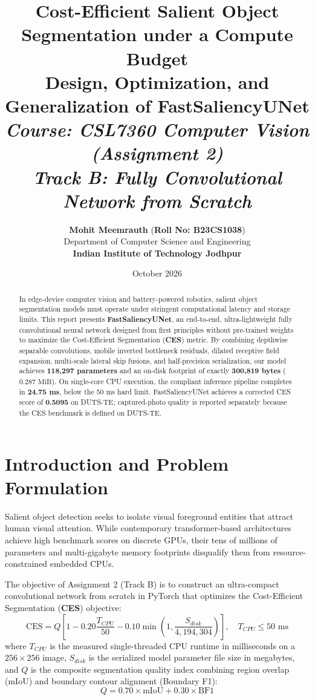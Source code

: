 \documentclass[10pt,a4paper]{article}
\title{
    \vspace{-1.2cm}
    \LARGE \textbf{\textcolor{primaryblue}{Cost-Efficient Salient Object Segmentation under a Compute Budget}} \\
    \vspace{0.2cm}
    \large \textbf{Design, Optimization, and Generalization of FastSaliencyUNet} \\
    \vspace{0.15cm}
    \normalsize \textit{Course: CSL7360 Computer Vision (Assignment 2)} \\
    \vspace{0.08cm}
    \normalsize \textit{Track B: Fully Convolutional Network from Scratch}
}
\author{
    \textbf{Mohit Meemrauth} \quad (\textbf{Roll No: B23CS1038}) \\
    Department of Computer Science and Engineering \\
    \textbf{Indian Institute of Technology Jodhpur}
}
\date{October 2026}
\begin{document}
\maketitle
\vspace{-0.5cm}

\begin{abstract}
\noindent In edge-device computer vision and battery-powered robotics, salient object segmentation models must operate under stringent computational latency and storage limits. This report presents \textbf{FastSaliencyUNet}, an end-to-end, ultra-lightweight fully convolutional neural network designed from first principles without pre-trained weights to maximize the Cost-Efficient Segmentation (\textbf{CES}) metric. By combining depthwise separable convolutions, mobile inverted bottleneck residuals, dilated receptive field expansion, multi-scale lateral skip fusions, and half-precision serialization, our model achieves \textbf{118,297 parameters} and an on-disk footprint of exactly \textbf{300,819 bytes} ($0.287\text{ MiB}$). On single-core CPU execution, the compliant inference pipeline completes in \textbf{24.75 ms}, below the 50 ms hard limit. FastSaliencyUNet achieves a corrected CES score of \textbf{0.5095} on DUTS-TE; captured-photo quality is reported separately because the CES benchmark is defined on DUTS-TE.
\end{abstract}
\vspace{-0.2cm}

\section{Introduction and Problem Formulation}

Salient object detection seeks to isolate visual foreground entities that attract human visual attention. While contemporary transformer-based architectures achieve high benchmark scores on discrete GPUs, their tens of millions of parameters and multi-gigabyte memory footprints disqualify them from resource-constrained embedded CPUs.

The objective of Assignment 2 (Track B) is to construct an ultra-compact convolutional network from scratch in PyTorch that optimizes the Cost-Efficient Segmentation (\textbf{CES}) objective:
\begin{equation}
\text{CES} = Q \left[ 1 - 0.20 \frac{T_{CPU}}{50} - 0.10 \min\left(1, \frac{S_{disk}}{4,194,304}\right) \right], \quad T_{CPU} \le 50\text{ ms}
\end{equation}
where $T_{CPU}$ is the measured single-threaded CPU runtime in milliseconds on a $256 \times 256$ image, $S_{disk}$ is the serialized model parameter file size in megabytes, and $Q$ is the composite segmentation quality index combining region overlap (mIoU) and boundary contour alignment (Boundary F1):
\begin{equation}
Q = 0.70 \times \text{mIoU} + 0.30 \times \text{BF1}
\end{equation}
\end{document}
